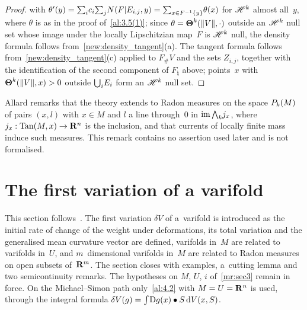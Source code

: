 \begin{proof}
    with $\theta'(y) = {\textstyle\sum_{i}^{}} c_i {\textstyle\sum_{j}^{}} N(F | E_{i,j},y) = {\textstyle\sum_{x \in
    F^{-1}\{y\}}^{}} \theta(x)$ for $\mathscr{H}^{k}$ almost all~$y$, where $\theta$ is as in the proof
    of~\ref{al:3.5(1)}; since $\theta = \boldsymbol{\Theta}^{k}(\|V\|,\cdot)$ outside an $\mathscr{H}^{k}$
    null set whose image under the locally Lipschitzian map~$F$ is $\mathscr{H}^{k}$ null, the density
    formula follows from~\ref{new:density_tangent}(a). The tangent formula follows
    from~\ref{new:density_tangent}(c) applied to $F_\# V$ and the sets $Z_{i,j}$, together with
    the identification of the second component of $F_\natural$ above; points~$x$ with
    $\boldsymbol{\Theta}^{k}(\|V\|,x) > 0$ outside ${{\textstyle \bigcup}}_i E_i$ form an $\mathscr{H}^{k}$ null set.
\end{proof}

\begin{remark}
    \label{al:3.6}
    Allard remarks that the theory extends to Radon measures on the space $P_{k}(M)$ of pairs
    $(x,l)$ with $x \in M$ and $l$ a line through~$0$ in $\operatorname{im} {\textstyle\boldsymbol{\bigwedge}}_{{k}} j_x$, where $j_x :
    \operatorname{Tan}(M,x) \to \mathbf{R}^{n}$ is the inclusion, and that currents of locally finite mass
    induce such measures. This remark contains no assertion used later and is not formalised.
\end{remark}

\section{The first variation of a varifold}
\label{sec:first_variation}

\begin{miniremark}
    \label{mr:sec4}
    This section follows~\cite[section~4]{Allard1972}. The first variation $\delta V$ of
    a~varifold is introduced as the initial rate of change of the weight under deformations,
    its total variation and the generalised mean curvature vector are defined, varifolds in~$M$
    are related to varifolds in~$U$, and $m$~dimensional varifolds in~$M$ are related to Radon
    measures on open subsets of~$\mathbf{R}^m$. The section closes with examples, a~cutting lemma and
    two semicontinuity remarks. The hypotheses on $M$, $U$, $i$ of~\ref{mr:sec3} remain in
    force. On the Michael--Simon path only~\ref{al:4.2} with $M = U = \mathbf{R}^{n}$ is used,
    through the integral formula $\delta V(g) = {\textstyle\int_{}^{}} \mathrm{D} g(x) \bullet S \,\mathrm{d} V(x,S)$.
\end{miniremark}

